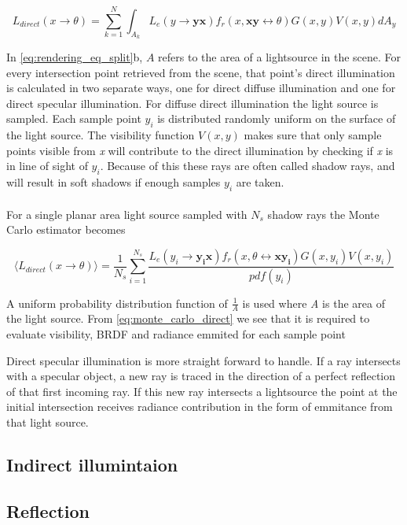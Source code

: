 \documentclass[]{report}   %
\begin{document}
\begin{equation}
\label{eq:disc_direct}
L_{direct}(x \rightarrow \theta) = \sum^{N}_{k=1} \int_{A_k}L_e(y \rightarrow \mathbf{yx}) f_r(x, \mathbf{xy}\leftrightarrow \theta)G(x,y)V(x,y)dA_y
\end{equation}

In \autoref{eq:rendering_eq_split}b, $A$ refers to the area of a lightsource in the scene.
For every intersection point retrieved from the scene, that point's direct illumination is calculated in two separate ways, one for direct diffuse illumination and one for direct specular illumination.
For diffuse direct illumination the light source is sampled.
Each sample point $y_i$ is distributed randomly uniform on the surface of the light source.
The visibility function $V(x,y)$ makes sure that only sample points visible from \emph{x} will contribute to the direct illumination by checking if \emph{x} is in line of sight of $y_i$.
Because of this these rays are often called shadow rays, and will result in soft shadows if enough samples $y_i$ are taken. \\
\\For a single planar area light source sampled with $N_s$ shadow rays the Monte Carlo estimator becomes

\begin{equation}
\label{eq:monte_carlo_direct}
\langle L_{direct}(x \rightarrow \theta) \rangle = \frac{1}{N_s} \sum^{N_s}_{i=1} \frac{L_e(y_i \rightarrow \mathbf{y_ix}) f_r(x, \theta \leftrightarrow \mathbf{xy_i})G(x,y_i)V(x,y_i)}{pdf(y_i)}
\end{equation}

A uniform probability distribution function of $\frac{1}{A}$ is used where \emph{A} is the area of the light source.
From \autoref{eq:monte_carlo_direct} we see that it is required to evaluate visibility, BRDF and radiance emmited for each sample point

Direct specular illumination is more straight forward to handle.
If a ray intersects with a specular object, a new ray is traced in the direction of a perfect reflection of that first incoming ray.
If this new ray intersects a lightsource the point at the initial intersection receives radiance contribution in the form of emmitance from that light source.

\subsection{Indirect illumintaion}
\subsection{Reflection}
\end{document}
